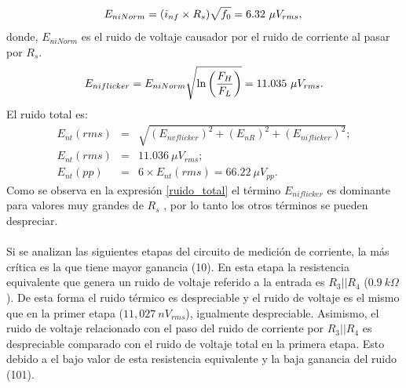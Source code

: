 \begin{equation}
    E_{niNorm}=(i_{nf}\times R_s)\sqrt{f_0}=6.32~\mu V_{rms}, \\
\end{equation}
donde, $E_{niNorm}$ es el ruido de voltaje causador por el ruido de corriente al pasar por $R_s$. 
\begin{equation}
    E_{niflicker}=E_{niNorm}\sqrt{\ln\left(\frac{F_H}{F_L}\right)}=11.035~\mu V_{rms}.\\
\end{equation}
El ruido total es:
\begin{eqnarray}
    E_{nt}(rms)&=&\sqrt{(E_{nvflicker})^2+(E_{nR})^2+(E_{niflicker})^2};\\
    \label{ruido_total}
     E_{nt}(rms)&=& 11.036~\mu V_{rms};\\
     E_{nt}(pp)&=& 6\times E_{nt}(rms)= 66.22~\mu V_{pp}.
\end{eqnarray}
Como se observa en la expresión \ref{ruido_total} el término $E_{niflicker}$ es dominante para valores muy grandes de $R_s$ \citep{noise_source}, por lo tanto los otros términos se pueden despreciar.\\ \\
Si se analizan las siguientes etapas del circuito de medición de corriente, la más crítica es la que tiene mayor ganancia (10). En esta etapa la resistencia equivalente que genera un ruido de voltaje referido  a la entrada es $R_3||R_4$ ($0.9~k\Omega$). De esta forma el ruido térmico es despreciable y el ruido de voltaje es el mismo que en la primer etapa  ($11,027~nV_{rms}$), igualmente despreciable. Asimismo, el ruido de voltaje relacionado con el paso del ruido de corriente por $R_3||R_4$ es despreciable comparado con el ruido de voltaje total en la primera etapa. Esto debido a el bajo valor de esta resistencia equivalente y la baja ganancia del ruido (101).\\\\
